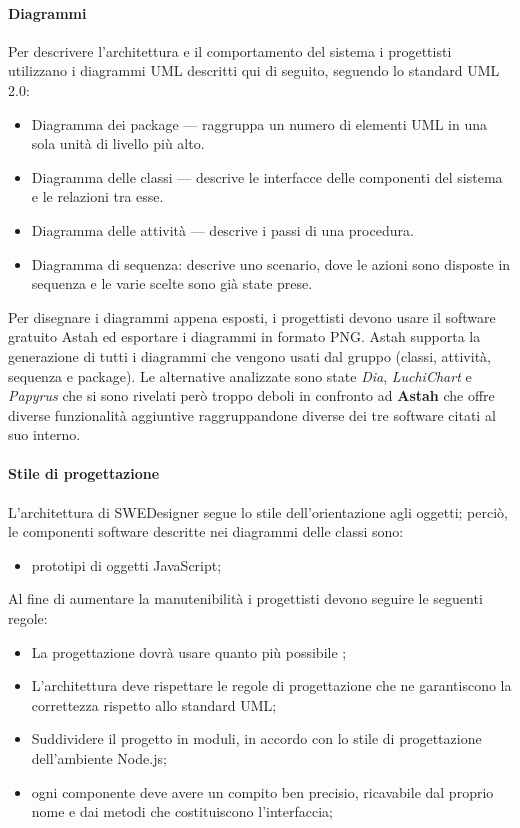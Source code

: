 \paragraph{Diagrammi} Per descrivere l’architettura e il comportamento del
sistema i progettisti utilizzano i diagrammi UML descritti qui di seguito, seguendo
lo standard UML 2.0:
\begin{itemize}
\item Diagramma dei package — raggruppa un numero di elementi UML in
una sola unità di livello più alto.
\item Diagramma delle classi — descrive le interfacce delle componenti del
sistema e le relazioni tra esse.
\item Diagramma delle attività — descrive i passi di una procedura.
\item Diagramma di sequenza: descrive uno scenario, dove le azioni sono disposte
in sequenza e le varie scelte sono già state prese.
\end{itemize}
Per disegnare i diagrammi appena esposti, i progettisti devono usare il software
gratuito Astah ed esportare i diagrammi in formato PNG. Astah supporta la
generazione di tutti i diagrammi che vengono usati dal gruppo (classi, attività,
sequenza e package). Le alternative analizzate sono state \emph{Dia}, \emph{LuchiChart} e \emph{Papyrus} che si sono rivelati però troppo deboli in confronto ad \textbf{Astah} che offre
      diverse funzionalità aggiuntive raggruppandone diverse dei tre software citati al suo interno.

\paragraph{Stile di progettazione} L’architettura di SWEDesigner segue lo
stile dell’orientazione agli oggetti; perciò, le componenti software descritte
nei diagrammi delle classi sono:
\begin{itemize}
\item prototipi di oggetti JavaScript;
\end{itemize}

Al fine di aumentare la manutenibilità i progettisti devono seguire le seguenti regole:
\begin{itemize}
\item La progettazione dovrà usare quanto più possibile ;
\item L'architettura deve rispettare le regole di progettazione che ne garantiscono la correttezza rispetto allo standard UML;
\item Suddividere il progetto in moduli, in accordo con lo stile di progettazione dell'ambiente Node.js;
\item ogni componente deve avere un compito ben precisio, ricavabile dal proprio nome e dai metodi che costituiscono l'interfaccia;
\end{itemize}

